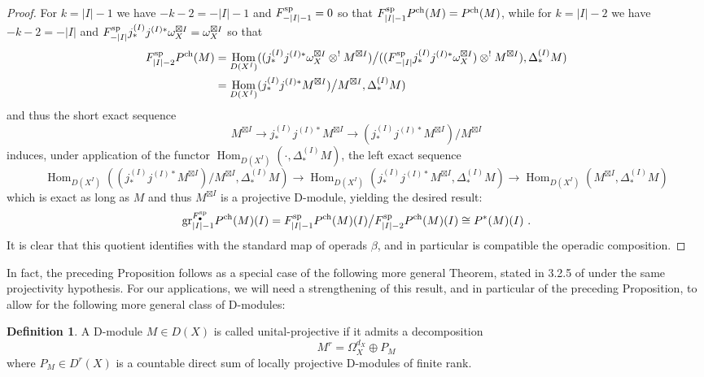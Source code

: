 \documentclass[11pt]{amsart}
\numberwithin{equation}{section}
\theoremstyle{definition}
\newtheorem{defn}[theo]{Definition}
\newcommand{\spe}{{\textup{sp}}}
\DeclareMathOperator{\Hom}{Hom}
\newcommand{\ch}{{\textup{ch}}}
\newcommand{\0}{{\textbf{0}}}
\newcommand{\DD}{{D}}
\newcommand{\gr}{\textup{gr}}
\def\ch{{\rm ch}}
\begin{document}
\begin{proof}
For $k=|I|-1$ we have $-k-2=-|I|-1$ and $F_{-|I|-1}^\spe=0$ so that $F_{|I|-1}^\spe P^\ch(M) = P^\ch(M)$, while for $k=|I|-2$ we have $-k-2=-|I|$ and $F^\spe_{-|I|}  j^{(I)}_*j^{(I)*}\omega_X^{\boxtimes I} = \omega_{X}^{\boxtimes I}$ so that
\begin{align*}
	 F_{|I|-2}^\spe P^\ch(M) & = \Hom_{\DD(X^I)}((j^{(I)}_*j^{(I)*}\omega_{X}^{\boxtimes I}\otimes^! M^{\boxtimes I} )\big/ ((F_{-|I|}^\spe j^{(I)}_*j^{(I)*}\omega_{X}^{\boxtimes I}) \otimes^! M^{\boxtimes I}), \Delta^{(I)}_*M ) \\
	 &  = \Hom_{\DD(X^I)}(j^{(I)}_*j^{(I)*}M^{\boxtimes I} )\big/ M^{\boxtimes I}, \Delta^{(I)}_*M ) 
\end{align*}
and thus the short exact sequence
\[ M^{\boxtimes I}  \to j^{(I)}_*j^{(I)*}M^{\boxtimes I} \to (j^{(I)}_*j^{(I)*}M^{\boxtimes I} )\big/ M^{\boxtimes I}  \]
induces, under application of the functor $\Hom_{\DD(X^I)}(\cdot, \Delta_*^{(I)}M)$, the left exact sequence
\[\Hom_{\DD(X^I)}((j^{(I)}_*j^{(I)*}M^{\boxtimes I} )\big/ M^{\boxtimes I} , \Delta_*^{(I)}M) \to \Hom_{\DD(X^I)}(j^{(I)}_*j^{(I)*}M^{\boxtimes I} , \Delta_*^{(I)}M) \to \Hom_{\DD(X^I)}(M^{\boxtimes I} , \Delta_*^{(I)}M) \]
which is exact as long as $M$ and thus $M^{\boxtimes I}$ is a projective D-module, yielding the desired result:
\[ \gr_{|I|-1}^{F_\bullet^\spe} P^\ch(M)(I) = F_{|I|-1}^\spe P^\ch(M)(I) \big/ F_{|I|-2}^\spe P^\ch(M)(I) \cong P^*(M)(I) \ . \]
It is clear that this quotient identifies with the standard map of operads $\beta$, and in particular is compatible the operadic composition.
\end{proof}


In fact, the preceding Proposition follows as a special case of the following more general Theorem, stated in 3.2.5 of \cite{BD1} under the same projectivity hypothesis. For our applications, we will need a strengthening of this result, and in particular of the preceding Proposition, to allow for the following more general class of D-modules:

\begin{defn} A D-module $M\in \DD(X)$ is called unital-projective if it admits a decomposition
	\[ M^r= \Omega^{d_X}_X \oplus P_M\]
	where $P_M\in \DD^r(X)$ is a countable direct sum of locally projective D-modules of finite rank.
\end{defn}
\end{document}
